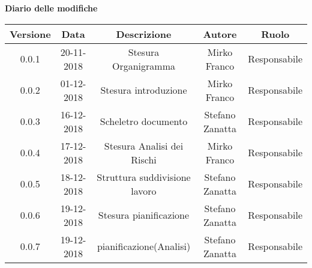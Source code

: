 	\begin{center}
		\textbf{Diario delle modifiche}
	\end{center}
	\begin{center}
		\begin{tabular}{|c|c|c|c|c|}
			\hline
			\textbf{Versione} & \textbf{Data} & \textbf{Descrizione} & \textbf{Autore} & \textbf{Ruolo} \\
			\hline
			0.0.1 & 20-11-2018 & Stesura Organigramma & Mirko Franco & Responsabile\\
			\hline
			0.0.2 & 01-12-2018 & Stesura introduzione & Mirko Franco & Responsabile\\
			\hline
			0.0.3 & 16-12-2018 & Scheletro documento &Stefano Zanatta & Responsabile\\
			\hline
			0.0.4 & 17-12-2018 & Stesura Analisi dei Rischi & Mirko Franco & Responsabile\\
			\hline
			0.0.5 & 18-12-2018 & Struttura suddivisione lavoro & Stefano Zanatta & Responsabile\\
			\hline
			0.0.6 & 19-12-2018 & Stesura pianificazione & Stefano Zanatta & Responsabile\\
			\hline
			0.0.7 & 19-12-2018 & pianificazione(Analisi) & Stefano Zanatta & Responsabile\\
			\hline
			
		\end{tabular}
	\end{center}
\newpage